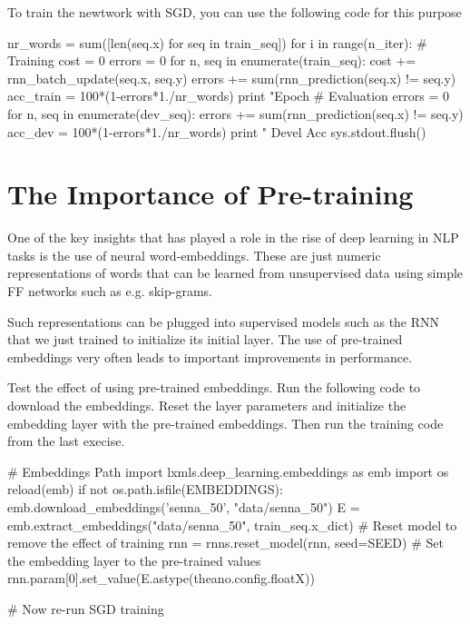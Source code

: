 \begin{exercise}
\clearpage

\noindent To train the newtwork with SGD, you can use the following code for
this purpose
\begin{python}
nr_words = sum([len(seq.x) for seq in train_seq])
for i in range(n_iter):
    # Training
    cost = 0
    errors = 0
    for n, seq in enumerate(train_seq):
        cost += rnn_batch_update(seq.x, seq.y)
        errors += sum(rnn_prediction(seq.x) != seq.y)
    acc_train = 100*(1-errors*1./nr_words) 
    print "Epoch %
    # Evaluation    
    errors = 0
    for n, seq in enumerate(dev_seq):
        errors += sum(rnn_prediction(seq.x) != seq.y)  
    acc_dev = 100*(1-errors*1./nr_words) 
    print " Devel Acc %
    sys.stdout.flush()
\end{python}


\end{exercise}


\section{The Importance of Pre-training}


One of the key insights that has played a role in the rise of deep learning in
NLP tasks is the use of neural word-embeddings. These are just numeric 
representations of words that can be learned from unsupervised data using
simple FF networks such as e.g. skip-grams.

Such representations can be plugged into supervised models such as the RNN that we just
trained to initialize its initial layer. The use of pre-trained embeddings very often leads to
important improvements in performance. 

\begin{exercise}
Test the effect of using pre-trained embeddings. Run the following code to
download the embeddings. Reset the layer parameters and initialize the
embedding layer with the pre-trained embeddings. Then run the training code
from the last execise.
\begin{python}
# Embeddings Path
import lxmls.deep_learning.embeddings as emb
import os
reload(emb)
if not os.path.isfile(EMBEDDINGS):
    emb.download_embeddings('senna_50', "data/senna_50")
E = emb.extract_embeddings("data/senna_50", train_seq.x_dict) 
# Reset model to remove the effect of training
rnn = rnns.reset_model(rnn, seed=SEED)
# Set the embedding layer to the pre-trained values
rnn.param[0].set_value(E.astype(theano.config.floatX)) 

# Now re-run SGD training
\end{python}
\end{exercise}

